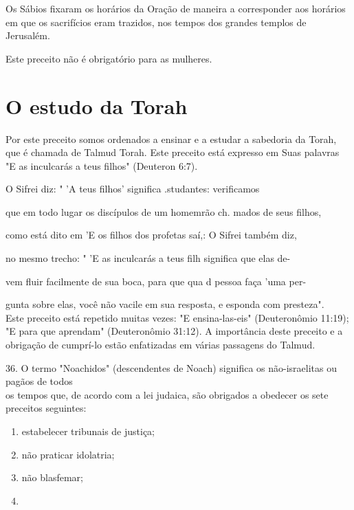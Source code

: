 \begin{itemize}
\begin{enumrate}
\begin{itemize}
\begin{itemize}
Os Sábios fixaram os horários da Oração de maneira a corresponder aos
horários em que os sacrifícios eram trazidos, nos tempos dos grandes
tem­plos de Jerusalém.

Este preceito não é obrigatório para as mulheres.

\section{O estudo da Torah}

Por este preceito somos ordenados a ensinar e a estudar a sabedoria da
Torah, que é chamada de Talmud Torah. Este preceito está expresso em
Suas palavras "E as inculcarás a teus filhos" (Deuteron 6:7).

O Sifrei diz: " 'A teus filhos' significa .studantes: verificamos


que em todo lugar os discípulos de um homemrão ch. mados de seus filhos,


como está dito em 'E os filhos dos profetas saí,: O Sifrei também diz,

no mesmo trecho: " 'E as inculcarás a teus filh significa que elas de-

vem fluir facilmente de sua boca, para que qua d pessoa faça 'uma per-


gunta sobre elas, você não vacile em sua resposta, e esponda com
presteza".\\
Este preceito está repetido muitas vezes: "E ensina-las-eis"
(Deuteronômio
11:19); "E para que aprendam" (Deuteronômio 31:12). A importância
deste preceito
e a obrigação de cumprí-lo estão enfatizadas em várias passagens
do Talmud.

36. O termo "Noachidos" (descendentes de Noach) significa os
não-israelitas ou pagãos de todos\\
os tempos que, de acordo com a lei judaica, são obrigados a obedecer os
sete preceitos seguintes:

\begin{enumerate}
\def\labelenumi{(\arabic{enumi})}
\item
 
 estabelecer tribunais de justiça;
 
\item
 
 não praticar idolatria;
 
\item
 
 não blasfemar;
 
\item
 

\end{enumerate}
\end{itemize}
\end{itemize}
\end{enumrate}
\end{itemize}
